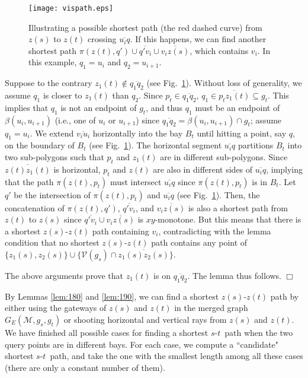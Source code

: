 \documentclass[english,runningheads,11pt]{llncs}
\def\calM{\mathcal{M}}
\def\calV{\mathcal{V}}
\def\st{$s$-$t$}
\newenvironment{proof}{\noindent {\textbf{Proof:}}\rm}{\hfill $\Box$\rm}
\begin{document}
\begin{proof}
\begin{figure}[t]
\begin{minipage}[t]{\linewidth}
\begin{center}
\texttt{[image: vispath.eps]}
\caption{\footnotesize Illustrating a possible shortest path (the red dashed curve) from
$z(s)$ to $z(t)$ crossing $\overline{u_iq}$. If this happens, we can
find another shortest path $\pi(z(t),q')\cup \overline{q'v_i}\cup
\overline{v_iz(s)}$, which contains $v_i$. In this example, $q_1=u_i$
and $q_2=u_{i+1}$.}
\label{fig:vispath}
\end{center}
\end{minipage}
\vspace*{-0.15in}
\end{figure}

Suppose to the contrary $z_1(t)\not\in \overline{q_1q_2}$ (see
Fig.~\ref{fig:vispath}).
Without loss of generality, we assume $q_1$ is closer to $z_1(t)$
than $q_2$. Since $p_t\in \overline{q_1q_2}$, $q_1\in \overline{p_tz_1(t)}\subseteq g_t$.
This implies that $q_1$ is not an endpoint of $g_t$, and thus
$q_1$ must be an endpoint of $\beta(u_i,u_{i+1})$ (i.e., one of
$u_i$ or $u_{i+1}$) since
$\overline{q_1q_2}=\beta(u_i,u_{i+1})\cap g_t$; assume $q_1=u_i$.
We extend $\overline{v_iu_i}$ horizontally into the bay $B_t$ until
hitting a point, say $q$, on the boundary of $B_t$ (see
Fig.~\ref{fig:vispath}). The horizontal segment
$\overline{u_iq}$ partitions $B_t$ into two sub-polygons such that $p_t$ and
$z_1(t)$ are in different sub-polygons. Since $\overline{z(t)z_1(t)}$ is
horizontal, $p_t$ and $z(t)$ are also in different sides of
$\overline{u_iq}$, implying
that the path $\pi(z(t),p_t)$ must intersect
$\overline{u_iq}$ since $\pi(z(t),p_t)$ is in $B_t$.
Let $q'$ be the intersection of $\pi(z(t),p_t)$ and $\overline{u_iq}$ (see
Fig.~\ref{fig:vispath}).
Then, the concatenation of  $\pi(z(t),q')$, $\overline{q'v_i}$,
and $\overline{v_iz(s)}$ is also a shortest path from $z(t)$ to $z(s)$ since
$ \overline{q'v_i}\cup \overline{v_iz(s)}$ is $xy$-monotone.
But this means that there is a shortest
$z(s)$-$z(t)$ path containing $v_i$, contradicting
with the lemma condition that no shortest $z(s)$-$z(t)$ path contains any point of
$\{z_1(s),z_2(s)\}\cup \{\calV(g_s)\cap \overline{z_1(s)z_2(s)}\}$.

The above arguments prove that $z_1(t)$ is on $\overline{q_1q_2}$.
The lemma thus follows.
\end{proof}

By Lemmas \ref{lem:180} and \ref{lem:190}, we can find a shortest
$z(s)$-$z(t)$ path by either using the gateways of $z(s)$ and
$z(t)$ in the merged graph
$G_E(\calM,g_s,g_t)$ or shooting horizontal and vertical rays from
$z(s)$ and $z(t)$. We have finished all possible cases for finding a
shortest \st\ path when the two query points are in different bays.
For each case, we compute a ``candidate" shortest \st\ path, and take
the one with the smallest length among all these cases (there are only a
constant number of them).
\end{document}
